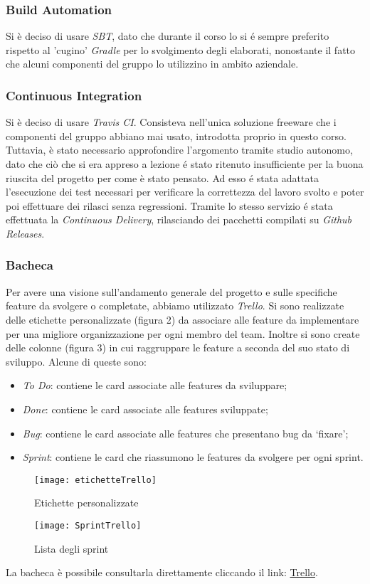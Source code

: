 \subsubsection{Build Automation}
Si è deciso di usare \textit{SBT}, dato che durante il corso lo si é sempre preferito rispetto al 'cugino' \textit{Gradle} per lo svolgimento degli elaborati, nonostante il fatto che alcuni componenti del gruppo lo utilizzino in ambito aziendale.

\subsubsection{Continuous Integration}
Si è deciso di usare \textit{Travis CI}.
Consisteva nell'unica soluzione freeware che i componenti del gruppo abbiano mai usato, introdotta proprio in questo corso.
Tuttavia, è stato necessario approfondire l'argomento tramite studio autonomo, dato che ciò che si era appreso a lezione é stato ritenuto insufficiente per la buona riuscita del progetto per come è stato pensato.
Ad esso é stata adattata l'esecuzione dei test necessari per verificare la correttezza del lavoro svolto e poter poi effettuare dei rilasci senza regressioni.
Tramite lo stesso servizio é stata effettuata la \textit{Continuous Delivery}, rilasciando dei pacchetti compilati su \textit{Github Releases}.

\subsubsection{Bacheca}
Per avere una visione sull’andamento generale del progetto e sulle specifiche feature da svolgere o completate, abbiamo utilizzato \textit{Trello}.
\newline
Si sono realizzate delle etichette personalizzate (figura 2) da associare alle feature da implementare per una migliore organizzazione per ogni membro del team. Inoltre si sono create delle colonne (figura 3) in cui raggruppare le feature a seconda del suo stato di sviluppo.
Alcune di queste sono:
\begin{itemize}
    \item \textit{To Do}: contiene le card associate alle features da sviluppare;
    \item \textit{Done}: contiene le card associate alle features sviluppate;
    \item \textit{Bug}: contiene le card associate alle features che presentano bug da ‘fixare’;
    \item \textit{Sprint}: contiene le card che riassumono le features da svolgere per ogni sprint.
\end{itemize}
\begin{figure}
    \centering
    \texttt{[image: etichetteTrello]}
    \caption{Etichette personalizzate}
\end{figure}
\begin{figure}
    \centering
    \texttt{[image: SprintTrello]}
    \caption{Lista degli sprint}
\end{figure}
La bacheca è possibile consultarla direttamente cliccando il link:   \href{https://trello.com/b/Nk4j3Kuf/pps}{Trello}.
